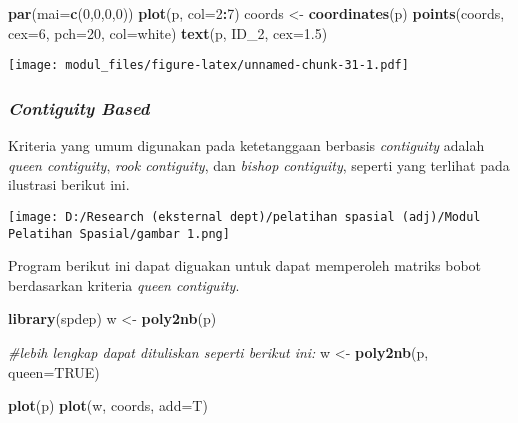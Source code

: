 \documentclass[
]{book}
\newenvironment{Shaded}{\begin{snugshade}}{\end{snugshade}}
\newcommand{\CommentTok}[1]{\textcolor[rgb]{0.56,0.35,0.01}{\textit{#1}}}
\newcommand{\DataTypeTok}[1]{\textcolor[rgb]{0.13,0.29,0.53}{#1}}
\newcommand{\DecValTok}[1]{\textcolor[rgb]{0.00,0.00,0.81}{#1}}
\newcommand{\FloatTok}[1]{\textcolor[rgb]{0.00,0.00,0.81}{#1}}
\newcommand{\KeywordTok}[1]{\textcolor[rgb]{0.13,0.29,0.53}{\textbf{#1}}}
\newcommand{\NormalTok}[1]{#1}
\newcommand{\OperatorTok}[1]{\textcolor[rgb]{0.81,0.36,0.00}{\textbf{#1}}}
\newcommand{\OtherTok}[1]{\textcolor[rgb]{0.56,0.35,0.01}{#1}}
\newcommand{\StringTok}[1]{\textcolor[rgb]{0.31,0.60,0.02}{#1}}
\begin{document}
\begin{Shaded}
\begin{Highlighting}[]
\KeywordTok{par}\NormalTok{(}\DataTypeTok{mai=}\KeywordTok{c}\NormalTok{(}\DecValTok{0}\NormalTok{,}\DecValTok{0}\NormalTok{,}\DecValTok{0}\NormalTok{,}\DecValTok{0}\NormalTok{))}
\KeywordTok{plot}\NormalTok{(p, }\DataTypeTok{col=}\DecValTok{2}\OperatorTok{:}\DecValTok{7}\NormalTok{)}
\NormalTok{coords \textless{}{-}}\StringTok{ }\KeywordTok{coordinates}\NormalTok{(p)}
\KeywordTok{points}\NormalTok{(coords, }\DataTypeTok{cex=}\DecValTok{6}\NormalTok{, }\DataTypeTok{pch=}\DecValTok{20}\NormalTok{, }\DataTypeTok{col=}\StringTok{\textquotesingle{}white\textquotesingle{}}\NormalTok{)}
\KeywordTok{text}\NormalTok{(p, }\StringTok{\textquotesingle{}ID\_2\textquotesingle{}}\NormalTok{, }\DataTypeTok{cex=}\FloatTok{1.5}\NormalTok{)}
\end{Highlighting}
\end{Shaded}

\texttt{[image: modul\_files/figure-latex/unnamed-chunk-31-1.pdf]}

\hypertarget{contiguity-based}{%
\subsubsection{\texorpdfstring{\emph{Contiguity Based}}{Contiguity Based}}\label{contiguity-based}}

Kriteria yang umum digunakan pada ketetanggaan berbasis \emph{contiguity} adalah \emph{queen contiguity}, \emph{rook contiguity}, dan \emph{bishop contiguity}, seperti yang terlihat pada ilustrasi berikut ini.

\texttt{[image: D:/Research (eksternal dept)/pelatihan spasial (adj)/Modul Pelatihan Spasial/gambar 1.png]}

Program berikut ini dapat diguakan untuk dapat memperoleh matriks bobot berdasarkan kriteria \emph{queen contiguity}.

\begin{Shaded}
\begin{Highlighting}[]
\KeywordTok{library}\NormalTok{(spdep)}
\NormalTok{w \textless{}{-}}\StringTok{ }\KeywordTok{poly2nb}\NormalTok{(p)}

\CommentTok{\#lebih lengkap dapat dituliskan seperti berikut ini:}
\NormalTok{w \textless{}{-}}\StringTok{ }\KeywordTok{poly2nb}\NormalTok{(p, }\DataTypeTok{queen=}\OtherTok{TRUE}\NormalTok{)}

\KeywordTok{plot}\NormalTok{(p)}
\KeywordTok{plot}\NormalTok{(w, coords, }\DataTypeTok{add=}\NormalTok{T)}
\end{Highlighting}
\end{Shaded}
\end{document}
